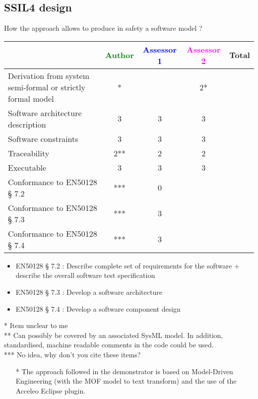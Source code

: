 \begin{assesor1}
\subsection{SSIL4 design}

How the approach allows to produce in safety a software model ?

\begin{tabular}{|l | c | c | c | c|}
\hline
& \textcolor{green}{Author} & \textcolor{blue}{Assessor 1} & \textcolor{magenta}{Assessor 2} & Total \\
\hline
Derivation from system semi-formal or strictly formal model &* & &2* & \\
\hline
Software architecture description &3 & 3 &3 & \\
\hline
Software constraints &3 &3 &3 & \\
\hline
Traceability &2** &2 &2 & \\
\hline
Executable &3 &3 &3 & \\
\hline
Conformance to EN50128 § 7.2 &*** &0 & & \\
\hline
Conformance to EN50128 § 7.3 &*** &3 & & \\
\hline
Conformance to EN50128 § 7.4 &*** &3 & & \\
\hline
\end{tabular}
\begin{assessor1}
\begin{itemize}
\item  EN50128 § 7.2 : Describe complete set of requirements for the
  software + describe the overall software test specification
\item EN50128 § 7.3 :  Develop a software architecture 
\item EN50128 § 7.4 : Develop a software component design
\end{itemize}
\end{assessor1}

\begin{author_comment}
* Item unclear to me\\
** Can possibly be covered by an associated SysML model. In addition, standardised, machine readable comments in the code could be used.\\
*** No idea, why don't you cite these items?
\end{author_comment}

\begin{assessor2}
  \begin{itemize}
  \item[*] The approach followed in the demonstrator is based on
    Model-Driven Engineering (with the MOF model to text transform)
    and the use of the Acceleo Eclipse plugin.
  \end{itemize}  
\end{assessor2}




\end{assesor1}
